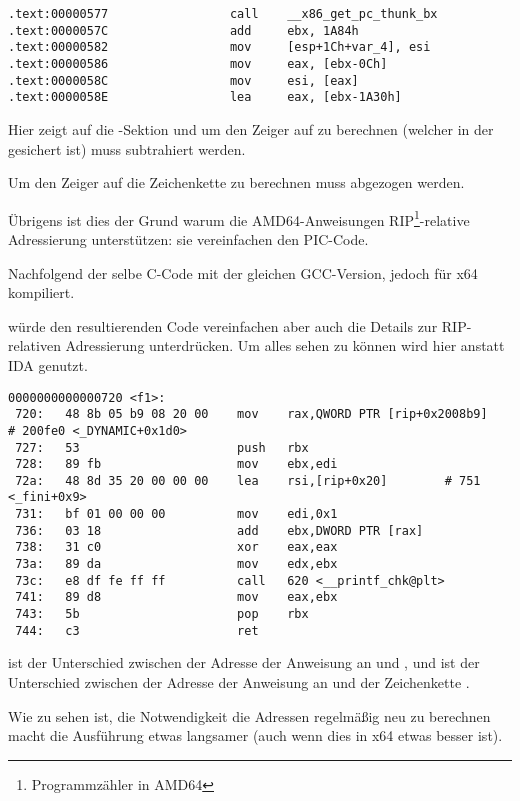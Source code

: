 \begin{lstlisting}
.text:00000577                 call    __x86_get_pc_thunk_bx
.text:0000057C                 add     ebx, 1A84h
.text:00000582                 mov     [esp+1Ch+var_4], esi
.text:00000586                 mov     eax, [ebx-0Ch]
.text:0000058C                 mov     esi, [eax]
.text:0000058E                 lea     eax, [ebx-1A30h]
\end{lstlisting}

Hier zeigt \EBX auf die -Sektion und um den Zeiger auf \globvar{} zu berechnen
(welcher in der  gesichert ist) muss  subtrahiert werden.

Um den Zeiger auf die Zeichenkette \retstring{} zu berechnen muss  abgezogen werden.


Übrigens ist dies der Grund warum die AMD64-Anweisungen RIP\footnote{Programmzähler in AMD64}-relative Adressierung
unterstützen: sie vereinfachen den PIC-Code.

Nachfolgend der selbe C-Code mit der gleichen GCC-Version, jedoch für x64 kompiliert.

\IDA würde den resultierenden Code vereinfachen aber auch die Details zur RIP-relativen Adressierung
unterdrücken. Um alles sehen zu können wird hier  anstatt IDA genutzt.

\begin{lstlisting}
0000000000000720 <f1>:
 720:	48 8b 05 b9 08 20 00 	mov    rax,QWORD PTR [rip+0x2008b9]        # 200fe0 <_DYNAMIC+0x1d0>
 727:	53                   	push   rbx
 728:	89 fb                	mov    ebx,edi
 72a:	48 8d 35 20 00 00 00 	lea    rsi,[rip+0x20]        # 751 <_fini+0x9>
 731:	bf 01 00 00 00       	mov    edi,0x1
 736:	03 18                	add    ebx,DWORD PTR [rax]
 738:	31 c0                	xor    eax,eax
 73a:	89 da                	mov    edx,ebx
 73c:	e8 df fe ff ff       	call   620 <__printf_chk@plt>
 741:	89 d8                	mov    eax,ebx
 743:	5b                   	pop    rbx
 744:	c3                   	ret    
\end{lstlisting}

 ist der Unterschied zwischen der Adresse der Anweisung an  und \globvar{},
und  ist der Unterschied zwischen der Adresse der Anweisung an  und der
Zeichenkette \retstring{}.

Wie zu sehen ist, die Notwendigkeit die Adressen regelmäßig neu zu berechnen macht die Ausführung
etwas langsamer (auch wenn dies in x64 etwas besser ist).

